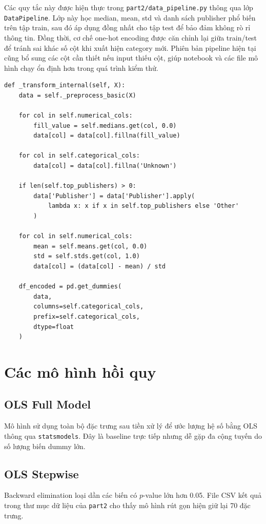 \documentclass[12pt,a4paper]{article}
\begin{document}
Các quy tắc này được hiện thực trong \texttt{part2/data\_pipeline.py} thông qua lớp \texttt{DataPipeline}. Lớp này học median, mean, std và danh sách publisher phổ biến trên tập train, sau đó áp dụng đồng nhất cho tập test để bảo đảm không rò rỉ thông tin. Đồng thời, cơ chế one-hot encoding được căn chỉnh lại giữa train/test để tránh sai khác số cột khi xuất hiện category mới. Phiên bản pipeline hiện tại cũng bổ sung các cột cần thiết nếu input thiếu cột, giúp notebook và các file mô hình chạy ổn định hơn trong quá trình kiểm thử.

\begin{lstlisting}[caption={Trích đoạn tiền xử lý dữ liệu trong \texttt{part2/data\_pipeline.py}}]
def _transform_internal(self, X):
    data = self._preprocess_basic(X)

    for col in self.numerical_cols:
        fill_value = self.medians.get(col, 0.0)
        data[col] = data[col].fillna(fill_value)

    for col in self.categorical_cols:
        data[col] = data[col].fillna('Unknown')

    if len(self.top_publishers) > 0:
        data['Publisher'] = data['Publisher'].apply(
            lambda x: x if x in self.top_publishers else 'Other'
        )

    for col in self.numerical_cols:
        mean = self.means.get(col, 0.0)
        std = self.stds.get(col, 1.0)
        data[col] = (data[col] - mean) / std

    df_encoded = pd.get_dummies(
        data,
        columns=self.categorical_cols,
        prefix=self.categorical_cols,
        dtype=float
    )
\end{lstlisting}

\section{Các mô hình hồi quy}
\subsection{OLS Full Model}
Mô hình sử dụng toàn bộ đặc trưng sau tiền xử lý để ước lượng hệ số bằng OLS thông qua \texttt{statsmodels}. Đây là baseline trực tiếp nhưng dễ gặp đa cộng tuyến do số lượng biến dummy lớn.

\subsection{OLS Stepwise}
Backward elimination loại dần các biến có $p$-value lớn hơn 0.05. File CSV kết quả trong thư mục dữ liệu của \texttt{part2} cho thấy mô hình rút gọn hiện giữ lại 70 đặc trưng.
\end{document}
